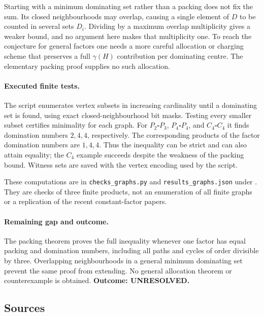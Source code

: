 \documentclass[11pt,a4paper]{article}
\begin{document}
Starting with a minimum dominating set rather than a packing does not
fix the sum. Its closed neighbourhoods may overlap, causing a single
element of $D$ to be counted in several sets $D_i$. Dividing by a
maximum overlap multiplicity gives a weaker bound, and no argument
here makes that multiplicity one. To reach the conjecture for general
factors one needs a more careful allocation or charging scheme that
preserves a full $\gamma(H)$ contribution per dominating centre.
The elementary packing proof supplies no such allocation.

\paragraph{Executed finite tests.}
The script enumerates vertex subsets in increasing cardinality until
a dominating set is found, using exact closed-neighbourhood bit masks.
Testing every smaller subset certifies minimality for each graph.
For $P_2\square P_3$, $P_4\square P_4$, and $C_4\square C_4$
it finds domination numbers $2,4,4$, respectively. The corresponding
products of the factor domination numbers are $1,4,4$. Thus the
inequality can be strict and can also attain equality; the $C_4$
example succeeds despite the weakness of the packing bound.
Witness sets are saved with the vertex encoding used by the script.

These computations are in \texttt{checks\_graphs.py} and
\texttt{results\_graphs.json} under
.
They are checks of three finite products, not an enumeration of all
finite graphs or a replication of the recent constant-factor papers.

\paragraph{Remaining gap and outcome.}
The packing theorem proves the full inequality whenever one factor
has equal packing and domination numbers, including all paths and
cycles of order divisible by three. Overlapping neighbourhoods in a
general minimum dominating set prevent the same proof from extending.
No general allocation theorem or counterexample is obtained.
\textbf{Outcome: UNRESOLVED.}

\subsection{Sources}
\end{document}
